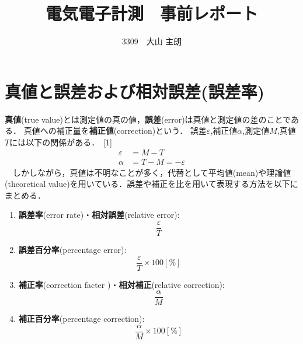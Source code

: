 \documentclass[fleqn,dvipdfmx]{jarticle}
\title{電気電子計測　事前レポート}
\author{3309　大山 主朗}
\date{}
\begin{document}
\maketitle
\section{真値と誤差および相対誤差(誤差率)}
\textbf{真値}(true value)とは測定値の真の値，\textbf{誤差}(error)は真値と測定値の差のことである．
真値への補正量を\textbf{補正値}(correction)という．
誤差$\varepsilon$,補正値$\alpha$,測定値$M$,真値$T$には以下の関係がある．~[1]\\
\begin{align}
	\varepsilon &=M-T\\
	\alpha &=T-M=-\varepsilon
\end{align}
　しかしながら，真値は不明なことが多く，代替として平均値(mean)や理論値(theoretical value)を用いている．誤差や補正を比を用いて表現する方法を以下にまとめる． \\
\begin{enumerate}
	\item \textbf{誤差率}(error rate)・\textbf{相対誤差}(relative error):
	\begin{equation}
	\frac{\varepsilon}{T}
	\end{equation}
	\item \textbf{誤差百分率}(percentage error):
	\begin{equation}
		\frac{\varepsilon}{T}\times 100[\%]
	\end{equation}
	\item \textbf{補正率}(correction facter
		)・\textbf{相対補正}(relative correction):
	\begin{equation}
		\frac{\alpha}{M}
	\end{equation}
	\item \textbf{補正百分率}(percentage correction):
	\begin{equation}
		\frac{\alpha}{M}\times 100[\%]
	\end{equation}
\end{enumerate}
\end{document}
